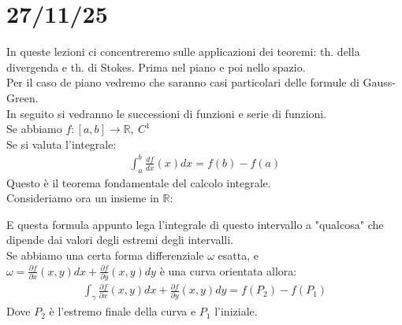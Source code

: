 \documentclass[a4paper, oneside]{article}
\begin{document}
  \newpage
  \section{27/11/25}
  
In queste lezioni ci concentreremo sulle applicazioni dei teoremi: th. della divergenda e th. di Stokes. Prima nel piano e poi nello spazio.\\
Per il caso de piano vedremo che saranno casi particolari delle formule di Gauss-Green.\\
In seguito si vedranno le successioni di funzioni e serie di funzioni.\\
Se abbiamo $f:[a,b] \to \mathbb{R}, \ C^1$\\
Se si valuta l'integrale:
\begin{gather*}
\int_a^b \frac{df}{dx}(x) dx = f(b) - f(a)
\end{gather*}
Questo è il teorema fondamentale del calcolo integrale.\\
Consideriamo ora un insieme in $\mathbb{R}$:
\begin{center}
\end{center}

E questa formula appunto lega l'integrale di questo intervallo a "qualcosa" che dipende  dai valori degli estremi degli intervalli.\\
Se abbiamo una certa forma differenziale $\omega$ esatta, e $\omega = \frac{\partial f}{\partial x} (x,y) dx + \frac{\partial f}{\partial y} (x,y) dy$ è una curva orientata allora:
\begin{gather*}
  \int_\gamma \frac{\partial f}{\partial x} (x,y) dx  + \frac{\partial f}{\partial y} (x,y) dy = f(P_2) - f(P_1)
\end{gather*}
Dove $P_2$ è l'estremo finale della curva e $P_1$ l'iniziale.\\
\begin{center}
\end{center}
\end{document}
